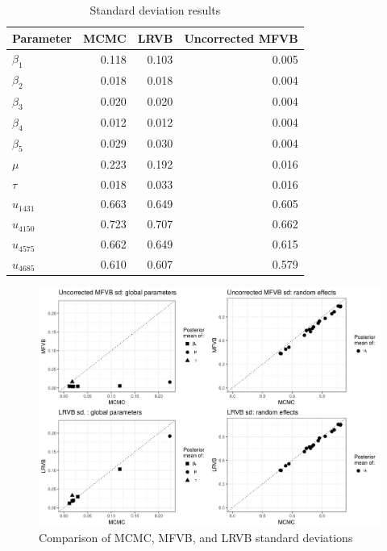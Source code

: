 \documentclass{article}\usepackage[]{graphicx}\usepackage[]{color}
\newenvironment{knitrout}{}{} %
\theoremstyle{plain}
\theoremstyle{definition}
\theoremstyle{plain}
\theoremstyle{plain}
\theoremstyle{plain}
\theoremstyle{plain}
\begin{document}
\begin{table}
\begin{center}%
\begin{tabular}{lrrr}
  \hline
Parameter & MCMC & LRVB & Uncorrected MFVB \\ 
  \hline
$\beta_{1}$ & 0.118 & 0.103 & 0.005 \\ 
  $\beta_{2}$ & 0.018 & 0.018 & 0.004 \\ 
  $\beta_{3}$ & 0.020 & 0.020 & 0.004 \\ 
  $\beta_{4}$ & 0.012 & 0.012 & 0.004 \\ 
  $\beta_{5}$ & 0.029 & 0.030 & 0.004 \\ 
  $\mu$ & 0.223 & 0.192 & 0.016 \\ 
  $\tau$ & 0.018 & 0.033 & 0.016 \\ 
  $u_{1431}$ & 0.663 & 0.649 & 0.605 \\ 
  $u_{4150}$ & 0.723 & 0.707 & 0.662 \\ 
  $u_{4575}$ & 0.662 & 0.649 & 0.615 \\ 
  $u_{4685}$ & 0.610 & 0.607 & 0.579 \\ 
   \hline
\end{tabular}
\end{center}
\caption{Standard deviation results\label{tab:sd_results}}
\end{table}
\begin{knitrout}
\color{fgcolor}\begin{figure}[!h]

{\centering \includegraphics[width=0.98\linewidth,height=0.686\linewidth]{figure/LogitGLMMMCMCComparisonSds-1} 

}

\caption[Comparison of MCMC, MFVB, and LRVB standard deviations]{Comparison of MCMC, MFVB, and LRVB standard deviations}\label{fig:LogitGLMMMCMCComparisonSds}
\end{figure}


\end{knitrout}
\end{document}
